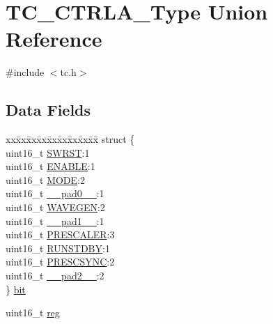 \hypertarget{union_t_c___c_t_r_l_a___type}{}\section{T\+C\+\_\+\+C\+T\+R\+L\+A\+\_\+\+Type Union Reference}
\label{union_t_c___c_t_r_l_a___type}


{\ttfamily \#include $<$tc.\+h$>$}

\subsection*{Data Fields}
\begin{DoxyCompactItemize}
\item 
\begin{tabbing}
xx\=xx\=xx\=xx\=xx\=xx\=xx\=xx\=xx\=\kill
struct \{\\
\>uint16\_t \mbox{\hyperlink{union_t_c___c_t_r_l_a___type_a4987fcca11694bd2ffae6a773a9bfc24}{SWRST}}:1\\
\>uint16\_t \mbox{\hyperlink{union_t_c___c_t_r_l_a___type_aec203800ebef356dc04f3e8986a824d8}{ENABLE}}:1\\
\>uint16\_t \mbox{\hyperlink{union_t_c___c_t_r_l_a___type_abd348ee828aadd0781f3fa97d167e564}{MODE}}:2\\
\>uint16\_t \mbox{\hyperlink{union_t_c___c_t_r_l_a___type_a77132c2c26a75f5b8751b235cda23828}{\_\_pad0\_\_}}:1\\
\>uint16\_t \mbox{\hyperlink{union_t_c___c_t_r_l_a___type_a62254048bc54afeeeb336dd4d6b581ed}{WAVEGEN}}:2\\
\>uint16\_t \mbox{\hyperlink{union_t_c___c_t_r_l_a___type_ab72e3a1f2f7db8695c60c658f5a0f11a}{\_\_pad1\_\_}}:1\\
\>uint16\_t \mbox{\hyperlink{union_t_c___c_t_r_l_a___type_a30db59a1afd851a8a4acd5d8605ca6ba}{PRESCALER}}:3\\
\>uint16\_t \mbox{\hyperlink{union_t_c___c_t_r_l_a___type_a0a98954fc108f309f3232355e809617b}{RUNSTDBY}}:1\\
\>uint16\_t \mbox{\hyperlink{union_t_c___c_t_r_l_a___type_a58ce17cfafebf43ca13fc0c1d902deba}{PRESCSYNC}}:2\\
\>uint16\_t \mbox{\hyperlink{union_t_c___c_t_r_l_a___type_a82701c5ec65a0fca9a84d8edc46a8192}{\_\_pad2\_\_}}:2\\
\} \mbox{\hyperlink{union_t_c___c_t_r_l_a___type_a8c6c8d1454010658241ce794c71c7c2d}{bit}}\\

\end{tabbing}\item 
uint16\+\_\+t \mbox{\hyperlink{union_t_c___c_t_r_l_a___type_a11760f5020019f4aa8cb02e694f7cc44}{reg}}
\end{DoxyCompactItemize}


